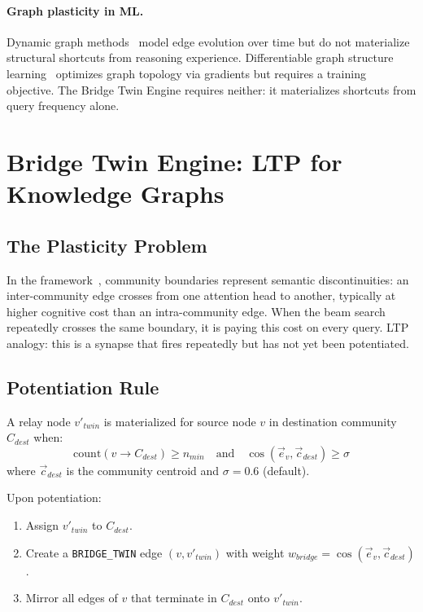 \documentclass[10pt,twocolumn]{article}
\begin{document}
\paragraph{Graph plasticity in ML.}
Dynamic graph methods~\cite{kazemi2020} model edge evolution over time but do not
materialize structural shortcuts from reasoning experience. Differentiable graph
structure learning~\cite{franceschi2019} optimizes graph topology via gradients but
requires a training objective. The Bridge Twin Engine requires neither: it materializes
shortcuts from query frequency alone.

\section{Bridge Twin Engine: LTP for Knowledge Graphs}
\label{sec:bridge}

\subsection{The Plasticity Problem}

In the \CEREBRUM{} framework~\cite{buchorn2026flagship}, community boundaries represent
semantic discontinuities: an inter-community edge crosses from one attention head to
another, typically at higher cognitive cost than an intra-community edge. When the beam
search repeatedly crosses the same boundary, it is paying this cost on every query.
LTP analogy: this is a synapse that fires repeatedly but has not yet been potentiated.

\subsection{Potentiation Rule}

A relay node $v'_{twin}$ is materialized for source node $v$ in destination community
$C_{dest}$ when:
\begin{equation}
\mathrm{count}(v \to C_{dest}) \geq n_{min}
\quad\text{and}\quad
\cos(\vec{e}_v, \vec{c}_{dest}) \geq \sigma
\label{eq:potentiation}
\end{equation}
where $\vec{c}_{dest}$ is the community centroid and $\sigma = 0.6$ (default).

Upon potentiation:
\begin{enumerate}
  \item Assign $v'_{twin}$ to $C_{dest}$.
  \item Create a \texttt{BRIDGE\_TWIN} edge $(v, v'_{twin})$ with weight
        $w_{bridge} = \cos(\vec{e}_v, \vec{c}_{dest})$.
  \item Mirror all edges of $v$ that terminate in $C_{dest}$ onto $v'_{twin}$.
\end{enumerate}
\end{document}
